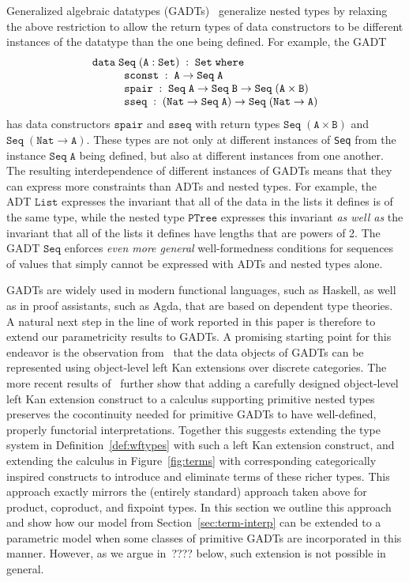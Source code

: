 \documentclass{lmcs}
\theoremstyle{plain}\newtheorem{satz}[thm]{Satz}
\begin{document}
Generalized algebraic datatypes (GADTs){\color{red}~\cite{???}}
generalize nested types by relaxing the above restriction to allow the
return types of data constructors to be different instances of the
datatype than the one being defined. For example, the GADT {\small
\[\begin{array}{l}
\mathtt{data\; Seq \;(A : Set)\;:\;Set\;where}\\
\hspace*{0.4in}\mathtt{sconst\;:\; A \rightarrow Seq\;A}\\
\hspace*{0.4in}\mathtt{spair\;:\;Seq\;A \rightarrow Seq\;B \rightarrow
  Seq\;(A\times B)}\\
\hspace*{0.4in}\mathtt{sseq\;:\;(Nat \rightarrow Seq\;A) \rightarrow
  Seq\;(Nat \to A)}
\end{array}\]}
\noindent
\!\!has data constructors $\mathtt{spair}$ and $\mathtt{sseq}$ with
return types $\mathtt{Seq\; (A \times B)}$ and $\mathtt{Seq\;(Nat \to
  A)}$. These types are not only at different instances of \verb|Seq|
from the instance $\mathtt{Seq\; A}$ being defined, but also at
different instances from one another. The resulting interdependence of
different instances of GADTs means that they can express more
constraints than ADTs and nested types. For example, the ADT
$\mathtt{List}$ expresses the invariant that all of the data in the
lists it defines is of the same type, while the nested type
$\mathtt{PTree}$ expresses this invariant {\em as well as} the
invariant that all of the lists it defines have lengths that are
powers of 2. The GADT $\mathtt{Seq}$ enforces {\em even more general}
well-formedness conditions for sequences of values that simply cannot
be expressed with ADTs and nested types alone.

GADTs are widely used in modern functional languages, such as Haskell,
as well as in proof assistants, such as Agda, that are based on
dependent type theories. A natural next step in the line of work
reported in this paper is therefore to extend our parametricity
results to GADTs. A promising starting point for this endeavor is the
observation from~\cite{jg08} that the data objects of GADTs can be
represented using object-level left Kan extensions over discrete
categories. The more recent results of~\cite{jp19} further show that
adding a carefully designed object-level left Kan extension construct
to a calculus supporting primitive nested types preserves the
cocontinuity needed for primitive GADTs to have well-defined, properly
functorial interpretations. Together this suggests extending the type
system in Definition~\ref{def:wftypes} with such a left Kan extension
construct, and extending the calculus in Figure~\ref{fig:terms} with
corresponding categorically inspired constructs to introduce and
eliminate terms of these richer types. This approach exactly mirrors
the (entirely standard) approach taken above for product, coproduct,
and fixpoint types. In this section we outline this approach and show
how our model from Section~\ref{sec:term-interp} can be extended to a
parametric model when some classes of primitive GADTs are incorporated
in this manner. However, as we argue in{\color{red}~????} below, such
extension is not possible in general.
\end{document}
